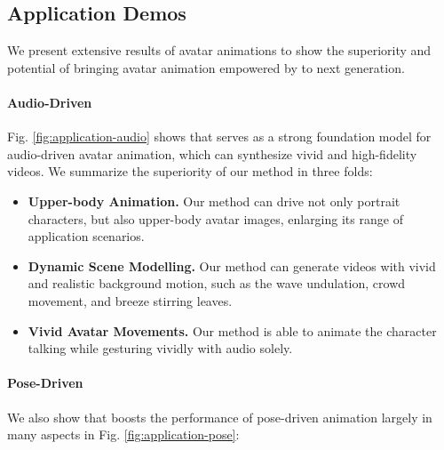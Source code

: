 

\subsection{Application Demos} We present extensive results of avatar animations to show the superiority and potential of bringing avatar animation empowered by {\nameofmethod} to next generation.

\paragraph{Audio-Driven}Fig. \ref{fig:application-audio} shows that {\nameofmethod} serves as a strong foundation model for audio-driven avatar animation, which can synthesize vivid and high-fidelity videos. We summarize the superiority of our method in three folds:

\begin{itemize}
    \item \textbf{Upper-body Animation.} Our method can drive not only portrait characters, but also upper-body avatar images, enlarging its range of application scenarios. 
    \item \textbf{Dynamic Scene Modelling.} Our method can generate videos with vivid and realistic background motion, such as the wave undulation, crowd movement, and breeze stirring leaves. 
    \item \textbf{Vivid Avatar Movements.} Our method is able to animate the character talking while gesturing vividly with audio solely.
\end{itemize}

\paragraph{Pose-Driven}We also show that {\nameofmethod} boosts the performance of pose-driven animation largely in many aspects in Fig. \ref{fig:application-pose}:

